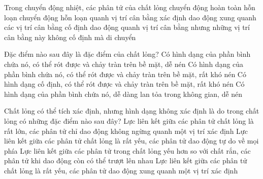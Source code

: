 \begin{ex}
	Trong chuyển động nhiệt, các phân tử của chất lỏng
	\choice
	{chuyển động hoàn toàn hỗn loạn}
	{chuyển động hỗn loạn quanh vị trí cân bằng xác định}
	{dao động xung quanh các vị trí cân bằng cố định}
	{\True dao động quanh vị trí cân bằng nhưng những vị trí cân bằng này không cố định mà di chuyển}
	\end{ex}

\begin{ex}
	Đặc điểm nào sau đây là đặc điểm của chất lỏng?
	\choice
	{Có hình dạng của phần bình chứa nó, có thể rót được và chảy tràn trên bề mặt, dễ nén}
	{\True Có hình dạng của phần bình chứa nó, có thể rót được và chảy tràn trên bề mặt, rất khó nén}
	{Có hình dạng cố định, có thể rót được và chảy tràn trên bề mặt, rất khó nén}
	{Có hình dạng của phần bình chứa nó, dễ dàng lan tỏa trong không gian, dễ nén}
	\end{ex}

\begin{ex}
	Chất lỏng có thể tích xác định, nhưng hình dạng không xác định là do trong chất lỏng có những đặc điểm nào sau đây?
	\choice
	{Lực liên kết giữa các phân tử chất lỏng là rất lớn, các phân tử chỉ dao động không ngừng quanh một vị trí xác định}
	{Lực liên kết giữa các phân tử chất lỏng là rất yếu, các phân tử dao động tự do về mọi phía}
	{\True Lực liên kết giữa các phân tử trong chất lỏng yếu hơn so với chất rắn, các phân tử khi dao động còn có thể trượt lên nhau}
	{Lực liên kết giữa các phân tử chất lỏng là rất yếu, các phân tử dao động xung quanh một vị trí xác định}
	\end{ex}



